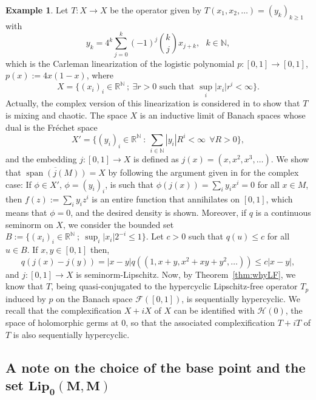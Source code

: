 \documentclass[12pt,english]{amsart}
\numberwithin{equation}{section}
\theoremstyle{plain}
\theoremstyle{definition}
\newtheorem{example}[theorem]{Example}
\newcommand{\N}{\mathbb{N}}
\newcommand{\R}{\mathbb{R}}
\newcommand{\spa}{\operatorname{span}}
\newcommand{\abs}[1]{\left\lvert#1\right\rvert}
\def\lip{ \text{Lip}}
\begin{document}
\begin{example} Let $T\colon X\to X$ be the operator given by $T(x_1,x_2,\dots )=(y_k)_{k\ge 1}$ with
\[
y_k=4^k\sum_{j=0}^{k} (-1)^j\binom{k}{j} x_{j+k}, \ \ \ k\in\N , 
\]
which is the Carleman linearization of the logistic polynomial $p\colon [0,1]\to [0,1]$, $p(x):=4x(1-x)$, where 
\[
X=\{ (x_i)_i\in\R^\N \ ; \ \exists r>0 \mbox{ such that } \sup_i\abs{x_i}r^i<\infty \} .
\]
Actually, the complex version of this linearization is considered in  \cite{MP15} to show that $T$ is mixing and chaotic.
The space $X$ is an inductive limit of Banach spaces whose dual is the Fréchet space 
$$
X'=\{ (y_i)_i\in\R^\N \ : \ \sum_{i\in\N}\abs{y_i}R^i<\infty  \ \ \forall R>0\} , 
$$
and the embedding 
$j \colon [0,1]\to X$ is defined as $j(x)=(x,x^2,x^3,\dots )$. We show that 
$\overline{\spa(j(M))}=X$  by following the argument given in \cite{MP15} for the complex case: If $\phi\in X'$, $\phi=(y_i)_i$, is such that $\phi(j(x))=\sum_i y_ix^i=0$ for all $x\in M$, then $f(z):=\sum_i y_iz^i$ is an entire function that annihilates on $[0,1]$, which means that $\phi=0$, and the desired density is shown. Moreover, if $q$ is a continuous seminorm on $X$, we consider the bounded set $B:=\{ (x_i)_i\in\R^\N \ ; \  \sup_i\abs{x_i}2^{-i}\leq 1 \}$. Let $c>0$ such that $q(u)\leq c$ for all $u\in B$. If $x,y\in [0,1]$ then, 
$$
q(j(x)-j(y))=\abs{x-y}q((1,x+y,x^2+xy+y^2,\dots))\leq c\abs{x-y}, 
$$
and $j\colon [0,1]\to X$ is seminorm-Lipschitz. 
Now, by Theorem~\ref{thm:whyLF}, we know that $T$, being quasi-conjugated to the hypercyclic Lipschitz-free operator $T_p$ induced by $p$ on the Banach space $\mathcal{F}([0,1])$,  is sequentially hypercyclic. We recall that the complexification $X+iX$ of $X$ 
can be identified with $\mathcal{H}(0)$, the space of holomorphic germs at $0$, so that the associated complexification $T+iT$ of $T$ is also sequentially hypercyclic. 
\end{example}








\subsection{A note on the choice of the base point and the set $\boldsymbol{\lip_0(M,M)}$} \label{subsec:base_point}
\end{document}
